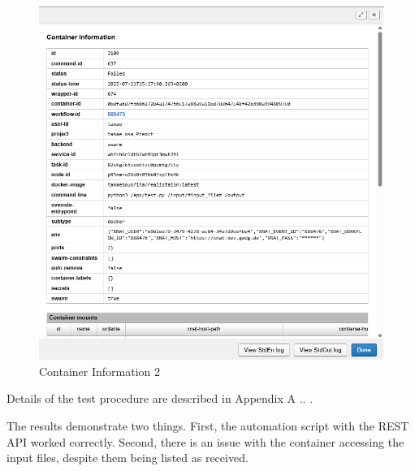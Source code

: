 \begin{figure}
    \centering
    \includegraphics[width=0.9\linewidth]{en/content/Container information 2.png}
    \caption{Container Information 2 }
    \label{fig:enter-label}
\end{figure}

Details of the test procedure are described in Appendix A \cite{bousfiha2025appendix}..
.

The results demonstrate two things.  First, the automation script with the REST API worked correctly. Second, there is an issue with the container accessing the input files, despite them being listed as received.
